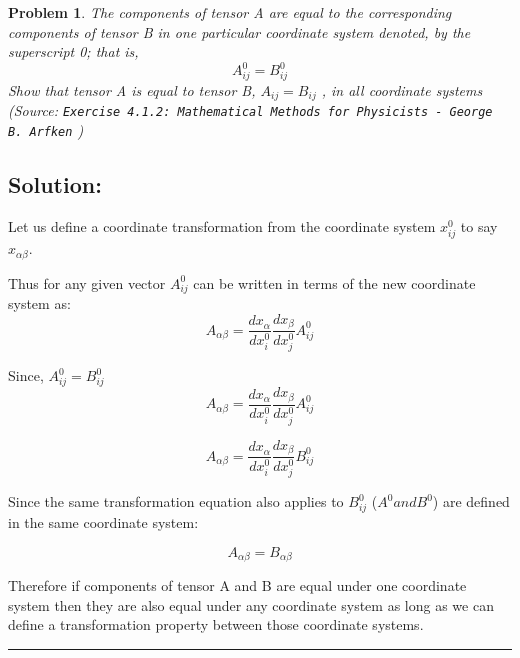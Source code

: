 \documentclass[11pt]{article}
\newenvironment{solution}{\subsection*{Solution:}}{\vspace{0.5cm} \hrule \vspace{0.7cm}}
\newtheorem{problem}{Problem}
\begin{document}
\begin{problem}

	The components of tensor A are equal to the corresponding components of
	tensor B in
	one particular coordinate system denoted, by the superscript 0; that is,
	$$ A_{ij}^0 = B_{ij}^0 $$
	Show that tensor A is equal to tensor B, $A_{ij} = B_{ij}$ , in all coordinate
	systems
        (Source: \texttt{Exercise 4.1.2: Mathematical Methods for Physicists -
	George B. Arfken} )
\end{problem}

\begin{solution}
	Let us define a coordinate transformation from the coordinate system
	$x^0_{ij}$ to say $x_{\alpha \beta}$.

	Thus for any given vector $A^0_{ij}$ can be written in terms of the new
	coordinate system as:
	$$ A_{\alpha \beta} = \frac{dx_{\alpha}}{dx^0_{i}}
	\frac{dx_{\beta}}{dx^0_{j}} A^0_{ij} $$

	Since, $A^0_{ij} = B^0_{ij}$
	$$ A_{\alpha \beta} = \frac{dx_{\alpha}}{dx^0_{i}}
	\frac{dx_{\beta}}{dx^0_{j}} A^0_{ij} $$

	$$ A_{\alpha \beta} = \frac{dx_{\alpha}}{dx^0_{i}}
	\frac{dx_{\beta}}{dx^0_{j}} B^0_{ij} $$

	Since the same transformation equation also applies to $B^0_{ij}$
	($A^0 and B^0$) are defined in the same coordinate system:

	$$ A_{\alpha \beta} = B_{\alpha \beta} $$

	Therefore if components of tensor A and B are equal under one coordinate
	system then they are also equal under any coordinate system as long as
	we can define a transformation property between those coordinate systems.
\end{solution}
\end{document}
